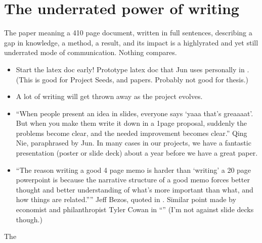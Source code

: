 \documentclass[letterpaper,10pt,english]{sphinxmanual}
\begin{document}
\section{The under\sphinxhyphen{}rated power of writing}
\label{\detokenize{02Elements:the-under-rated-power-of-writing}}
\sphinxAtStartPar
The paper \sphinxhyphen{} meaning a 4\sphinxhyphen{}10 page document, written in full sentences, describing a gap in knowledge, a method, a result, and its impact \sphinxhyphen{} is a highly\sphinxhyphen{}rated and yet still under\sphinxhyphen{}rated mode of communication. Nothing compares.
\begin{itemize}
\item {} 
\sphinxAtStartPar
Start the latex doc early! Prototype latex doc that Jun uses personally in . (This is good for Project Seeds, and papers. Probably not good for thesis.)

\item {} 
\sphinxAtStartPar
A lot of writing will get thrown away as the project evolves. 

\item {} 
\sphinxAtStartPar
“When people present an idea in slides, everyone says ‘yaaa that’s greaaaat’. But when you make them write it down in a 1\sphinxhyphen{}page proposal, suddenly the problems become clear, and the needed improvement becomes clear.” \sphinxhyphen{} Qing Nie, paraphrased by Jun.  In many cases in our projects, we have a fantastic presentation (poster or slide deck) about a year before we have a great paper.

\item {} 
\sphinxAtStartPar
“The reason writing a good 4 page memo is harder than ‘writing’ a 20 page powerpoint is because the narrative structure of a good memo forces better thought and better understanding of what’s more important than what, and how things are related.”” Jeff Bezos, quoted in . Similar point made by economist and philanthropist Tyler Cowan in “” (I’m not against slide decks though.)

\end{itemize}

\sphinxAtStartPar
The {\hyperref[\detokenize{PaperWritingTips:paperwritingtips}]{}}
\end{document}
